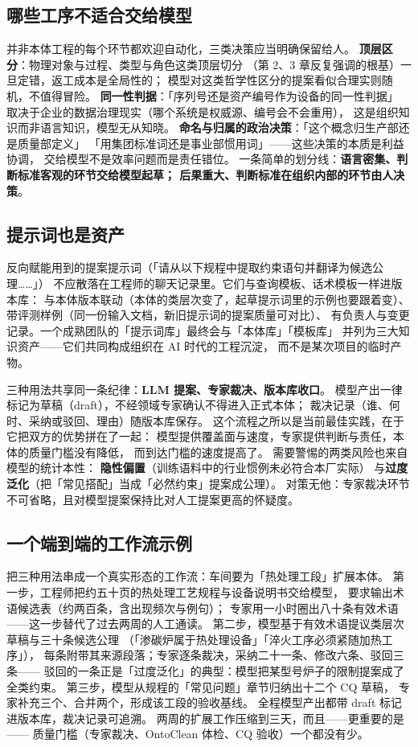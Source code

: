 \subsection{哪些工序不适合交给模型}

并非本体工程的每个环节都欢迎自动化，三类决策应当明确保留给人。
\textbf{顶层区分}：物理对象与过程、类型与角色这类顶层切分
（第 2、3 章反复强调的根基）一旦定错，返工成本是全局性的；
模型对这类哲学性区分的提案看似合理实则随机，不值得冒险。
\textbf{同一性判据}：「序列号还是资产编号作为设备的同一性判据」
取决于企业的数据治理现实（哪个系统是权威源、编号会不会重用），
这是组织知识而非语言知识，模型无从知晓。
\textbf{命名与归属的政治决策}：「这个概念归生产部还是质量部定义」
「用集团标准词还是事业部惯用词」——这些决策的本质是利益协调，
交给模型不是效率问题而是责任错位。
一条简单的划分线：\textbf{语言密集、判断标准客观的环节交给模型起草；
后果重大、判断标准在组织内部的环节由人决策}。

\subsection{提示词也是资产}

反向赋能用到的提案提示词（「请从以下规程中提取约束语句并翻译为候选公理……」）
不应散落在工程师的聊天记录里。它们与查询模板、话术模板一样进版本库：
与本体版本联动（本体的类层次变了，起草提示词里的示例也要跟着变）、
带评测样例（同一份输入文档，新旧提示词的提案质量可对比）、
有负责人与变更记录。一个成熟团队的「提示词库」最终会与「本体库」「模板库」
并列为三大知识资产——它们共同构成组织在 AI 时代的工程沉淀，
而不是某次项目的临时产物。

三种用法共享同一条纪律：\textbf{LLM 提案、专家裁决、版本库收口}。
模型产出一律标记为草稿（draft），不经领域专家确认不得进入正式本体；
裁决记录（谁、何时、采纳或驳回、理由）随版本库保存。
这个流程之所以是当前最佳实践，在于它把双方的优势拼在了一起：
模型提供覆盖面与速度，专家提供判断与责任，本体的质量门槛没有降低，
而到达门槛的速度提高了。
需要警惕的两类风险也来自模型的统计本性：
\textbf{隐性偏置}（训练语料中的行业惯例未必符合本厂实际）
与\textbf{过度泛化}（把「常见搭配」当成「必然约束」提案成公理）。
对策无他：专家裁决环节不可省略，且对模型提案保持比对人工提案更高的怀疑度。

\subsection{一个端到端的工作流示例}

把三种用法串成一个真实形态的工作流：车间要为「热处理工段」扩展本体。
第一步，工程师把约五十页的热处理工艺规程与设备说明书交给模型，
要求输出术语候选表（约两百条，含出现频次与例句）；
专家用一小时圈出八十条有效术语——这一步替代了过去两周的人工通读。
第二步，模型基于有效术语提议类层次草稿与三十条候选公理
（「渗碳炉属于热处理设备」「淬火工序必须紧随加热工序」），
每条附带其来源段落；专家逐条裁决，采纳二十一条、修改六条、驳回三条——
驳回的一条正是「过度泛化」的典型：模型把某型号炉子的限制提案成了全类约束。
第三步，模型从规程的「常见问题」章节归纳出十二个 CQ 草稿，
专家补充三个、合并两个，形成该工段的验收基线。
全程模型产出都带 draft 标记进版本库，裁决记录可追溯。
两周的扩展工作压缩到三天，而且——更重要的是——
质量门槛（专家裁决、OntoClean 体检、CQ 验收）一个都没有少。

